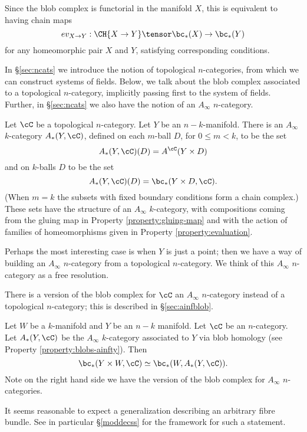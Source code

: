 Since the blob complex is functorial in the manifold $X$, this is equivalent to having chain maps
$$ev_{X \to Y} : \CH{X \to Y} \tensor \bc_*(X) \to \bc_*(Y)$$
for any homeomorphic pair $X$ and $Y$, 
satisfying corresponding conditions.

In \S \ref{sec:ncats} we introduce the notion of topological $n$-categories, from which we can construct systems of fields. Below, we talk about the blob complex associated to a topological $n$-category, implicitly passing first to the system of fields. Further, in \S \ref{sec:ncats} we also have the notion of an $A_\infty$ $n$-category.

\begin{property}
\label{property:blobs-ainfty}
Let $\cC$ be  a topological $n$-category.  Let $Y$ be an $n{-}k$-manifold. 
There is an $A_\infty$ $k$-category $A_*(Y, \cC)$, defined on each $m$-ball $D$, for $0 \leq m < k$, to be the set $$A_*(Y,\cC)(D) = A^\cC(Y \times D)$$ and on $k$-balls $D$ to be the set $$A_*(Y, \cC)(D) = \bc_*(Y \times D, \cC).$$ (When $m=k$ the subsets with fixed boundary conditions form a chain complex.) These sets have the structure of an $A_\infty$ $k$-category, with compositions coming from the gluing map in Property \ref{property:gluing-map} and with the action of families of homeomorphisms given in Property \ref{property:evaluation}.
\end{property}
\begin{rem}
Perhaps the most interesting case is when $Y$ is just a point; then we have a way of building an $A_\infty$ $n$-category from a topological $n$-category. We think of this $A_\infty$ $n$-category as a free resolution.
\end{rem}

There is a version of the blob complex for $\cC$ an $A_\infty$ $n$-category
instead of a topological $n$-category; this is described in \S \ref{sec:ainfblob}.

\begin{property}
\label{property:product}
Let $W$ be a $k$-manifold and $Y$ be an $n-k$ manifold. Let $\cC$ be an $n$-category.
Let $A_*(Y,\cC)$ be the $A_\infty$ $k$-category associated to $Y$ via blob homology (see Property \ref{property:blobs-ainfty}).
Then
\[
	\bc_*(Y\times W, \cC) \simeq \bc_*(W, A_*(Y,\cC)) .
\]
Note on the right hand side we have the version of the blob complex for $A_\infty$ $n$-categories.
\end{property}
It seems reasonable to expect a generalization describing an arbitrary fibre bundle. See in particular \S \ref{moddecss} for the framework for such a statement.

